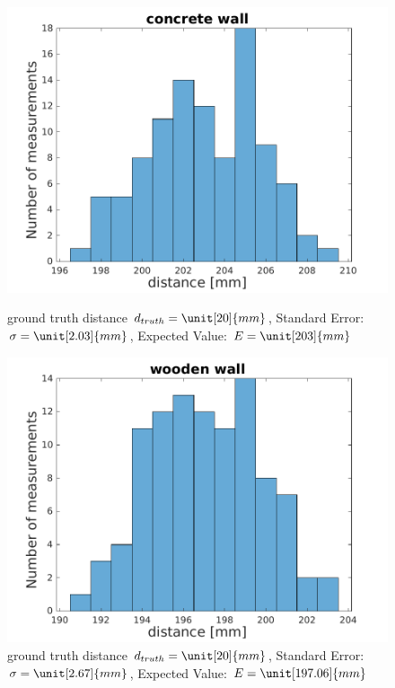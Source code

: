 \begin{figure}
	\centering
	\begin{minipage}{0.8\textwidth}
		\includegraphics[width=0.9\linewidth]{pictures/concrete_hist.pdf}
		\caption{ground truth distance $d_{truth}= \unit[20]{mm}$, Standard Error: $\sigma=\unit[2.03]{mm}$, Expected Value: $E=\unit[203]{mm}$}
		\label{fig:surface_hist_con1}
	\end{minipage}
	\quad
	\begin{minipage}{0.8\textwidth}
		\includegraphics[width=0.9\linewidth]{pictures/wooden_wall.pdf}
		\caption{ground truth distance $d_{truth}= \unit[20]{mm}$, Standard Error: $\sigma=\unit[2.67]{mm}$, Expected Value: $E=\unit[197.06]{mm}$}
		\label{fig:surface_hist_wood1}
	\end{minipage}
	\quad
	\begin{minipage}{0.8\textwidth}

\end{minipage}
\end{figure}
